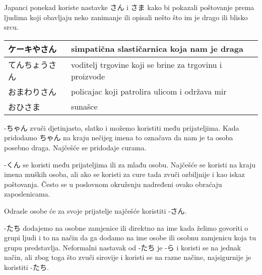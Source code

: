 	\vspace{10pt}
	
	
	Japanci ponekad koriste nastavke さん i さま kako bi pokazali poštovanje prema ljudima koji obavljaju neko zanimanje ili opisali nešto što im je drago ili blisko srcu.
	
	\vspace{10pt}	
	

\begin{tabular}{|l|p{400pt}|}
		\hline
		ケーキやさん&simpatična slastičarnica koja nam je draga\\\hline
		てんちょうさん&voditelj trgovine koji se brine za trgovinu i proizvode\\\hline
		おまわりさん&policajac koji patrolira ulicom i održava mir\\\hline
		おひさま&sunašce\\\hline
	\end{tabular}

	\vspace{10pt}	
	\newpage
	
	-ちゃん zvuči djetinjasto, slatko i možemo koristiti među prijateljima. Kada pridodamo ちゃん na kraju nečijeg imena to označava da nam je ta osoba posebno draga. Najčešće se pridodaje curama.
	
	\vspace{10pt}	
	
	-くん se koristi među prijateljima ili za mlađu osobu. Najčešće se koristi na kraju imena muških osoba, ali ako se koristi za cure tada zvuči ozbiljnije i kao iskaz poštovanja. Često se u poslovnom okruženju nadređeni ovako obraćaju zaposlenicama.
	
	\vspace{10pt}

Odrasle osobe će za svoje prijatelje najčešće koristiti -さん.

	\vspace{10pt}
	
	-たち dodajemo na osobne zamjenice ili direktno na ime kada želimo govoriti o grupi ljudi i to na način da ga dodamo na ime osobe ili osobnu zamjenicu koja tu grupu predstavlja. Neformalni nastavak od -たち je -ら i koristi se na jednak način, ali zbog toga što zvuči sirovije i koristi se na razne načine, najsigurnije je koristiti -たち.


	\begin{reibun}
	\end{reibun}

